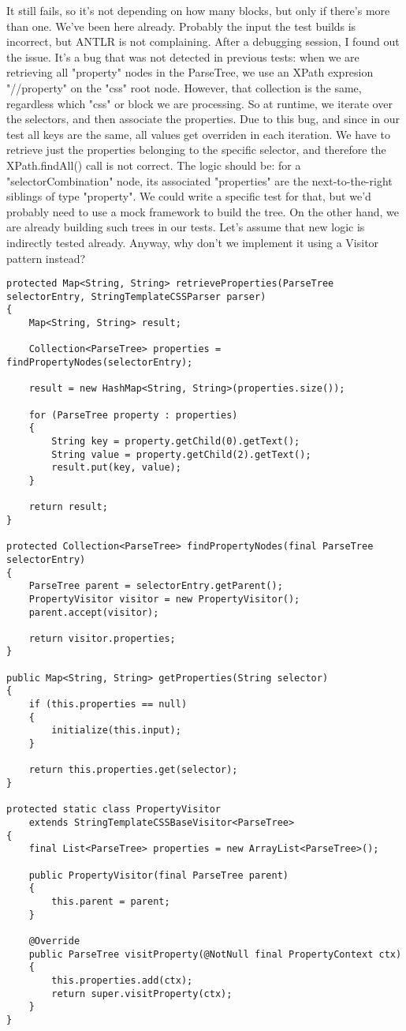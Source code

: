 \documentclass[11pt]{article}
\begin{document}
It still fails, so it's not depending on how many blocks, but only if there's more than one. We've been here already. Probably the input
the test builds is incorrect, but ANTLR is not complaining. After a debugging session, I found out the issue. It's a bug that was not
detected in previous tests: when we are retrieving all "property" nodes in the ParseTree, we use an XPath expresion "//property" on the
"css" root node. However, that collection is the same, regardless which "css" or block we are processing. So at runtime, we iterate
over the selectors, and then associate the properties. Due to this bug, and since in our test all keys are the same, all values get overriden in
each iteration. We have to retrieve just the properties belonging to the specific selector, and therefore the XPath.findAll() call is
not correct.
The logic should be: for a "selectorCombination" node, its associated "properties" are the next-to-the-right siblings of type "property".
We could write a specific test for that, but we'd probably need to use a mock framework to build the tree. On the other hand, we are
already building such trees in our tests. Let's assume that new logic is indirectly tested already.
Anyway, why don't we implement it using a Visitor pattern instead?

\begin{verbatim}
protected Map<String, String> retrieveProperties(ParseTree selectorEntry, StringTemplateCSSParser parser)
{
    Map<String, String> result;

    Collection<ParseTree> properties = findPropertyNodes(selectorEntry);

    result = new HashMap<String, String>(properties.size());

    for (ParseTree property : properties)
    {
        String key = property.getChild(0).getText();
        String value = property.getChild(2).getText();
        result.put(key, value);
    }

    return result;
}

protected Collection<ParseTree> findPropertyNodes(final ParseTree selectorEntry)
{
    ParseTree parent = selectorEntry.getParent();
    PropertyVisitor visitor = new PropertyVisitor();
    parent.accept(visitor);

    return visitor.properties;
}

public Map<String, String> getProperties(String selector)
{
    if (this.properties == null)
    {
        initialize(this.input);
    }

    return this.properties.get(selector);
}

protected static class PropertyVisitor
    extends StringTemplateCSSBaseVisitor<ParseTree>
{
    final List<ParseTree> properties = new ArrayList<ParseTree>();

    public PropertyVisitor(final ParseTree parent)
    {
        this.parent = parent;
    }

    @Override
    public ParseTree visitProperty(@NotNull final PropertyContext ctx)
    {
        this.properties.add(ctx);
        return super.visitProperty(ctx);
    }
}
\end{verbatim}
\end{document}
